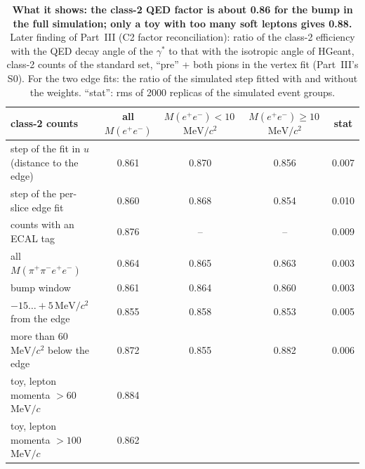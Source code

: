 \documentclass[11pt,a4paper]{article}
\newcommand{\Mfour}{\ensuremath{M(\pi^{+}\pi^{-}e^{+}e^{-})}\xspace}
\newcommand{\Mee}{\ensuremath{M(e^{+}e^{-})}\xspace}
\newcommand{\MeVc}{\ensuremath{\mathrm{MeV}/c}\xspace}
\newcommand{\MeVcc}{\ensuremath{\mathrm{MeV}/c^{2}}\xspace}
\begin{document}
\begin{table}[!htbp]
\centering
\caption{\textbf{What it shows: the class-2 QED factor is about 0.86 for the bump in the full simulation; only a toy with
too many soft leptons gives 0.88.} Later finding of Part~III (C2 factor reconciliation): ratio of the class-2 efficiency
with the QED decay angle of the $\gamma^*$ to that with the isotropic angle of HGeant, class-2 counts of the standard set,
``pre'' + both pions in the vertex fit (Part~III's S0). For the two edge fits: the ratio of the simulated step fitted with
and without the weights. ``stat'': rms of 2000 replicas of the simulated event groups.}
\label{tab:c2recon}
\footnotesize
\begin{tabular}{@{}l c c c c@{}}
\toprule
class-2 counts & all \Mee & $\Mee<10$\,\MeVcc & $\Mee\ge10$\,\MeVcc & stat \\
\midrule
step of the fit in $u$ (distance to the edge) & 0.861 & 0.870 & 0.856 & 0.007 \\
step of the per-slice edge fit & 0.860 & 0.868 & 0.854 & 0.010 \\
counts with an ECAL tag & 0.876 & -- & -- & 0.009 \\
all \Mfour & 0.864 & 0.865 & 0.863 & 0.003 \\
bump window & 0.861 & 0.864 & 0.860 & 0.003 \\
$-15\ldots+5$\,\MeVcc from the edge & 0.855 & 0.858 & 0.853 & 0.005 \\
more than 60\,\MeVcc below the edge & 0.872 & 0.855 & 0.882 & 0.006 \\
toy, lepton momenta $>60$\,\MeVc & 0.884 & & & \\
toy, lepton momenta $>100$\,\MeVc & 0.862 & & & \\
\bottomrule
\end{tabular}
\end{table}
\end{document}
